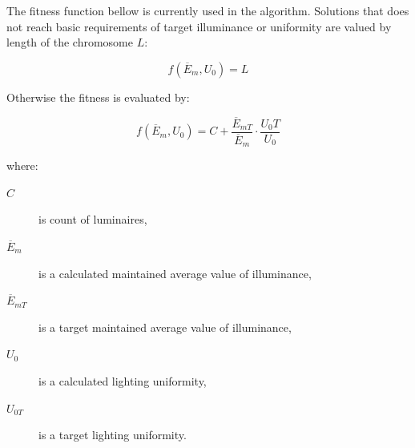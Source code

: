 The fitness function bellow is currently used in the algorithm. Solutions that does not reach basic requirements of target illuminance or uniformity are valued by length of the chromosome $L$:

\begin{equation}
\label{eq:fitV2EUA}
	f\left(\overline{E}_{m}, U_0\right)= L
\end{equation}

Otherwise the fitness is evaluated by:

\begin{equation}
\label{eq:fitV2EUB}
	f\left(\overline{E}_{m}, U_0\right)= C + \frac{\overline{E}_{mT}}{\overline{E}_{m}} \cdot \frac{U_0T}{U_0}
\end{equation}

\noindent where:
\begin{description}
	\item[$C$] is count of luminaires,
	\item[$\overline{E}_{m}$] is a calculated maintained average value of illuminance,
	\item[$\overline{E}_{mT}$] is a target maintained average value of illuminance,
	\item[$U_0$] is a calculated lighting uniformity,
	\item[$U_{0T}$] is a target lighting uniformity.
\end{description}